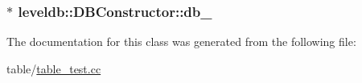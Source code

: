 \subsubsection[{db\+\_\+}]{$\ast$ leveldb\+::\+D\+B\+Constructor\+::db\+\_\+\hspace{0.3cm}{\ttfamily [private]}}\label{classleveldb_1_1_d_b_constructor_ac2bca4fa55c2ba59ad2edc0ba2848e3a}


The documentation for this class was generated from the following file\+:\begin{DoxyCompactItemize}
\item 
table/\hyperlink{table__test_8cc}{table\+\_\+test.\+cc}\end{DoxyCompactItemize}

